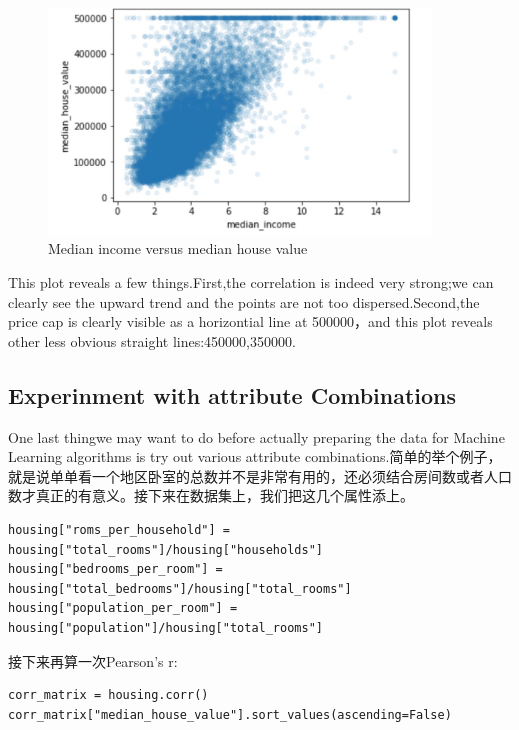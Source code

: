 \documentclass[UTF8]{ctexart}
\begin{document}
\begin{figure}[H]
\centering
\includegraphics[width = 4in]{specific_scatter.JPG}
\caption{Median income versus median house value}
\end{figure}

This plot reveals a few things.First,the correlation is indeed very strong;we can clearly see the upward trend and the points are not too dispersed.Second,the price cap is clearly visible as a horizontial line at 500000，and this plot reveals other less obvious straight lines:450000,350000.


\subsection{Experinment with attribute Combinations}
One last thingwe may want to do before actually preparing the data for Machine Learning algorithms is try out various attribute combinations.简单的举个例子，就是说单单看一个地区卧室的总数并不是非常有用的，还必须结合房间数或者人口数才真正的有意义。接下来在数据集上，我们把这几个属性添上。

\begin{lstlisting}
housing["roms_per_household"] = housing["total_rooms"]/housing["households"]
housing["bedrooms_per_room"] = housing["total_bedrooms"]/housing["total_rooms"]
housing["population_per_room"] = housing["population"]/housing["total_rooms"]
\end{lstlisting}

接下来再算一次Pearson's r:
\begin{lstlisting}
corr_matrix = housing.corr()
corr_matrix["median_house_value"].sort_values(ascending=False)
\end{lstlisting}
\end{document}
